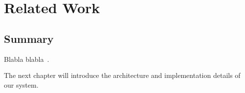 \chapter{Related Work}
\label{sec:relatedwork}
 
 \section*{Summary}

Blabla blabla~\cite{mapreduce-2008}.


The next chapter will introduce the architecture and implementation details of our system.
 
 
 
